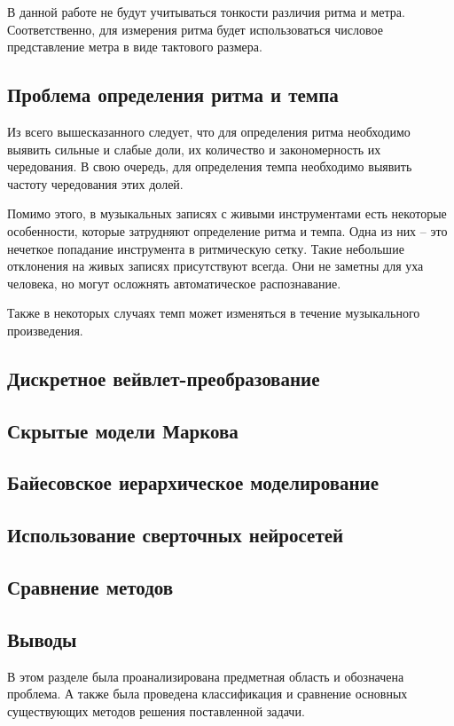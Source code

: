 В данной работе не будут учитываться тонкости различия ритма и метра. Соответственно, для измерения ритма будет использоваться числовое представление метра в виде тактового размера.

\subsection{Проблема определения ритма и темпа}

Из всего вышесказанного следует, что для определения ритма необходимо выявить сильные и слабые доли, их количество и закономерность их чередования. В свою очередь, для определения темпа необходимо выявить частоту чередования этих долей.

Помимо этого, в музыкальных записях с живыми инструментами есть некоторые особенности, которые затрудняют определение ритма и темпа. Одна из них -- это нечеткое попадание инструмента в ритмическую сетку. Такие небольшие отклонения на живых записях присутствуют всегда. Они не заметны для уха человека, но могут осложнять автоматическое распознавание.

Также в некоторых случаях темп может изменяться в течение музыкального произведения.

\subsection{Дискретное вейвлет-преобразование}



\subsection{Скрытые модели Маркова}



\subsection{Байесовское иерархическое моделирование}



\subsection{Использование сверточных нейросетей}



\subsection{Сравнение методов}



\subsection*{Выводы}

В этом разделе была проанализирована предметная область и обозначена проблема. А также была проведена классификация и сравнение основных существующих методов решения поставленной задачи.


